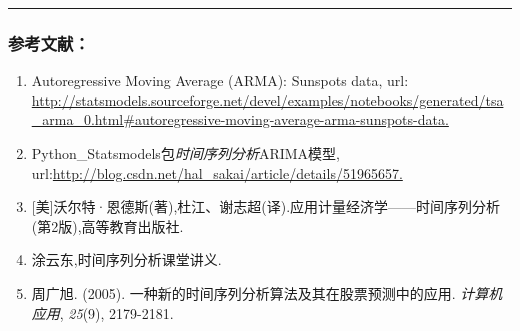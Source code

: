 \documentclass[]{article}
\begin{document}
\begin{center}\rule{0.5\linewidth}{\linethickness}\end{center}

\subsubsection{参考文献：}\label{header-c15}

\begin{enumerate}
\def\labelenumi{\arabic{enumi}.}
\item
  Autoregressive Moving Average (ARMA): Sunspots data, url:
  \url{http://statsmodels.sourceforge.net/devel/examples/notebooks/generated/tsa_arma_0.html\#autoregressive-moving-average-arma-sunspots-data.}
\item
  Python\_Statsmodels包\emph{时间序列分析}ARIMA模型,
  url:\url{http://blog.csdn.net/hal_sakai/article/details/51965657.}
\item
  {[}美{]}沃尔特·恩德斯(著),杜江、谢志超(译).应用计量经济学------时间序列分析(第2版),高等教育出版社.
\item
  涂云东,时间序列分析课堂讲义.
\item
  周广旭. (2005). 一种新的时间序列分析算法及其在股票预测中的应用.
  \emph{计算机应用}, \emph{25}(9), 2179-2181.
\end{enumerate}
\end{document}
